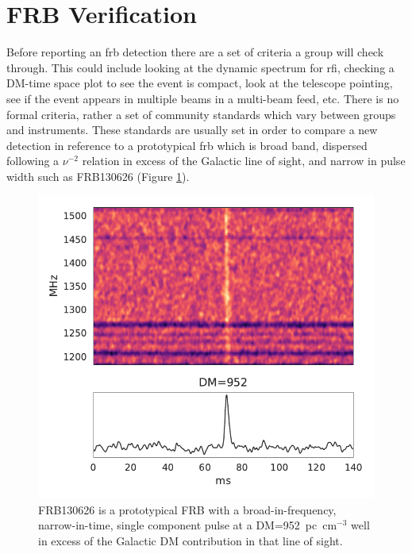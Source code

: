 \documentclass[a4paper,fleqn,usenatbib]{mnras}
\begin{document}
\section{FRB Verification}
\label{sec:verify_crit}

Before reporting an \gls{frb} detection there are a set of criteria a group will
check through. This could include looking at the dynamic spectrum for \gls{rfi},
checking a DM-time space plot to see the event is compact, look at the telescope
pointing, see if the event appears in multiple beams in a multi-beam feed, etc.
There is no formal criteria, rather a set of community standards which vary
between groups and instruments. These standards are usually set in order to
compare a new detection in reference to a prototypical \gls{frb} which is broad
band, dispersed following a $\nu^{-2}$ relation in excess of the Galactic line
of sight, and narrow in pulse width such as FRB130626
\citep{2016MNRAS.460L..30C} (Figure \ref{fig:FRB130626}).

\begin{figure}
    \includegraphics[width=1.0\linewidth]{figures/FRB130626.pdf}
    \caption{FRB130626 is a prototypical FRB with a broad-in-frequency,
    narrow-in-time, single component pulse at a DM=952~pc~cm$^{-3}$ well in
    excess of the Galactic DM contribution in that line of sight.
    }
    \label{fig:FRB130626}
\end{figure}
\end{document}
